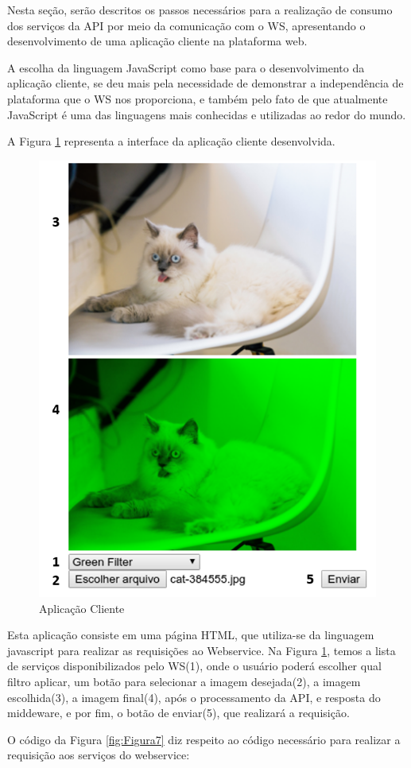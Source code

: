 \documentclass[12pt]{article}
\begin{document}
Nesta seção, serão descritos os passos necessários para a realização de consumo dos serviços da API por meio da comunicação com o WS, apresentando o desenvolvimento de uma aplicação cliente na plataforma web.

A escolha da linguagem JavaScript como base para o desenvolvimento da aplicação cliente, se deu mais pela necessidade de demonstrar a independência de plataforma que o WS nos proporciona, e também pelo fato de que atualmente JavaScript é uma das linguagens mais conhecidas e utilizadas ao redor do mundo.

A Figura \ref{fig:Figura6} representa a interface da aplicação cliente desenvolvida.

\begin{figure}[ht]
	\centering
	\includegraphics[width=.5\textwidth]{aplicacao-cliente.png}
	\caption{Aplicação Cliente}
	\label{fig:Figura6}
\end{figure}

Esta aplicação consiste em uma página HTML, que utiliza-se da linguagem javascript para realizar as requisições ao Webservice. Na Figura \ref{fig:Figura6}, temos a lista de serviços disponibilizados pelo WS(1), onde o usuário poderá escolher qual filtro aplicar, um botão para selecionar a imagem desejada(2), a imagem escolhida(3), a imagem final(4), após o processamento da API, e resposta do middeware, e por fim, o botão de enviar(5), que realizará a requisição.

O código da Figura \ref{fig:Figura7} diz respeito ao código necessário para realizar a requisição aos serviços do webservice:
\end{document}
